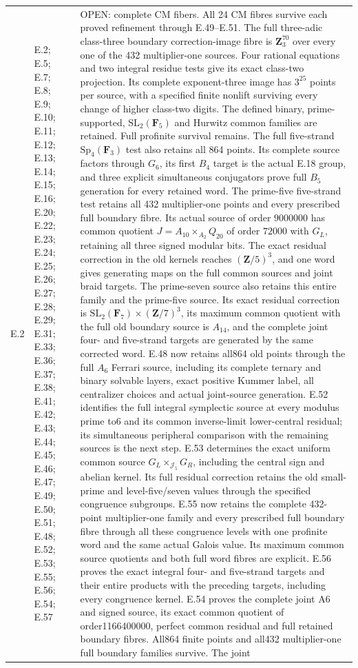\begin{longtable}{@{}p{1.1cm}p{3.0cm}p{10.3cm}@{}}
E.2 & E.2; E.5; E.7; E.8; E.9; E.10; E.11; E.12; E.13; E.14; E.15; E.16; E.20; E.22; E.23; E.24; E.25; E.26; E.27; E.28; E.29; E.31; E.33; E.36; E.37; E.38; E.41; E.42; E.43; E.44; E.45; E.46; E.47; E.49; E.50; E.51; E.48; E.52; E.53; E.55; E.56; E.54; E.57 & OPEN: complete CM fibers. All 24 CM fibres survive each proved refinement through E.49--E.51. The full three-adic class-three boundary correction-image fibre is $\mathbf Z_3^{70}$ over every one of the 432 multiplier-one sources. Four rational equations and two integral residue tests give its exact class-two projection. Its complete exponent-three image has $3^{25}$ points per source, with a specified finite nonlift surviving every change of higher class-two digits. The defined binary, prime-supported, $\mathrm{SL}_2(\mathbf F_5)$ and Hurwitz common families are retained. Full profinite survival remains. The full five-strand $\mathrm{Sp}_4(\mathbf F_3)$ test also retains all 864 points. Its complete source factors through $G_6$, its first $B_4$ target is the actual E.18 group, and three explicit simultaneous conjugators prove full $B_5$ generation for every retained word. The prime-five five-strand test retains all 432 multiplier-one points and every prescribed full boundary fibre. Its actual source of order $9000000$ has common quotient $J=A_{10}\times_{A_2}Q_{20}$ of order $72000$ with $G_L$, retaining all three signed modular bits. The exact residual correction in the old kernels reaches $(\mathbf Z/5)^3$, and one word gives generating maps on the full common sources and joint braid targets. The prime-seven source also retains this entire family and the prime-five source. Its exact residual correction is $\mathrm{SL}_2(\mathbf F_7)\times(\mathbf Z/7)^3$, its maximum common quotient with the full old boundary source is $A_{14}$, and the complete joint four- and five-strand targets are generated by the same corrected word. E.48 now retains all864 old points through the full $A_6$ Ferrari source, including its complete ternary and binary solvable layers, exact positive Kummer label, all centralizer choices and actual joint-source generation. E.52 identifies the full integral symplectic source at every modulus prime to6 and its common inverse-limit lower-central residual; its simultaneous peripheral comparison with the remaining sources is the next step. E.53 determines the exact uniform common source $G_L\times_{\mathcal J_5}G_R$, including the central sign and abelian kernel. Its full residual correction retains the old small-prime and level-five/seven values through the specified congruence subgroups. E.55 now retains the complete 432-point multiplier-one family and every prescribed full boundary fibre through all these congruence levels with one profinite word and the same actual Galois value. Its maximum common source quotients and both full word fibres are explicit. E.56 proves the exact integral four- and five-strand targets and their entire products with the preceding targets, including every congruence kernel. E.54 proves the complete joint A6 and signed source, its exact common quotient of order1166400000, perfect common residual and full retained boundary fibres. All864 finite points and all432 multiplier-one full boundary families survive. The joint 
\end{longtable}
